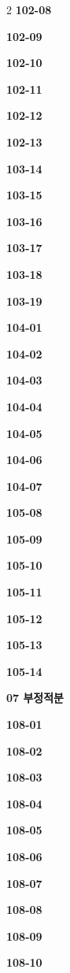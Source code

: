 \documentclass[10pt,a4paper]{article}
\begin{document}
\begin{multicols}{2}
\noindent\textbf{102-08}\ \par
\noindent\textbf{102-09}\ \par
\noindent\textbf{102-10}\ \par
\noindent\textbf{102-11}\ \par
\noindent\textbf{102-12}\ \par
\noindent\textbf{102-13}\ \par
\noindent\textbf{103-14}\ \par
\noindent\textbf{103-15}\ \par
\noindent\textbf{103-16}\ \par
\noindent\textbf{103-17}\ \par
\noindent\textbf{103-18}\ \par
\noindent\textbf{103-19}\ \par
\noindent\textbf{104-01}\ \par
\noindent\textbf{104-02}\ \par
\noindent\textbf{104-03}\ \par
\noindent\textbf{104-04}\ \par
\noindent\textbf{104-05}\ \par
\noindent\textbf{104-06}\ \par
\noindent\textbf{104-07}\ \par
\noindent\textbf{105-08}\ \par
\noindent\textbf{105-09}\ \par
\noindent\textbf{105-10}\ \par
\noindent\textbf{105-11}\ \par
\noindent\textbf{105-12}\ \par
\noindent\textbf{105-13}\ \par
\noindent\textbf{105-14}\ \par
\noindent\textbf{07 부정적분}\par\smallskip
\noindent\textbf{108-01}\ \par
\noindent\textbf{108-02}\ \par
\noindent\textbf{108-03}\ \par
\noindent\textbf{108-04}\ \par
\noindent\textbf{108-05}\ \par
\noindent\textbf{108-06}\ \par
\noindent\textbf{108-07}\ \par
\noindent\textbf{108-08}\ \par
\noindent\textbf{108-09}\ \par
\noindent\textbf{108-10}\ \par

\end{multicols}
\end{document}
